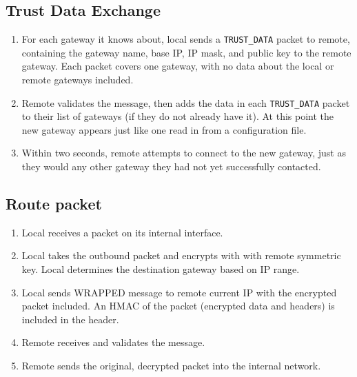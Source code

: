 \subsection{Trust Data Exchange}
\begin{enumerate}
	\item For each gateway it knows about, local sends a \texttt{TRUST\_DATA} packet to remote, containing the gateway name, base \ac{IP}, \ac{IP} mask, and public key to the remote gateway. Each packet covers one gateway, with no data about the local or remote gateways included.
	\item Remote validates the message, then adds the data in each \texttt{TRUST\_DATA} packet to their list of gateways (if they do not already have it). At this point the new gateway appears just like one read in from a configuration file.
	\item Within two seconds, remote attempts to connect to the new gateway, just as they would any other gateway they had not yet successfully contacted.
 \end{enumerate}

\subsection{Route packet}
\label{sec:arg_protocol_route}
\begin{enumerate}
	\item Local receives a packet on its internal interface.
	\item Local takes the outbound packet and encrypts with with remote symmetric key. Local determines the destination gateway based on \ac{IP} range.
	\item Local sends WRAPPED message to remote current IP with the encrypted packet included. An \ac{HMAC} of the packet (encrypted data and headers) is included in the header.
	\item Remote receives and validates the message.
	\item Remote sends the original, decrypted packet into the internal network.
\end{enumerate}


